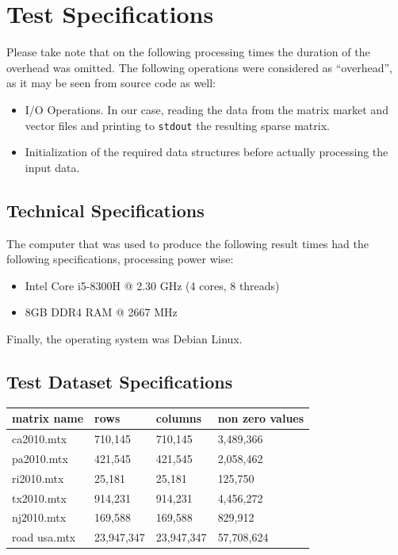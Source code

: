 \documentclass[11pt]{article}
\begin{document}
\section{Test Specifications}
\label{sec:org8809a5b}
Please take note that on the following processing times the duration of the overhead was omitted. The following operations were considered as ``overhead'', as it may be seen from source code as well:
\begin{itemize}
\item I/O Operations. In our case, reading the data from the matrix market and vector files and printing to \texttt{stdout} the resulting sparse matrix.
\item Initialization of the required data structures before actually processing the input data.
\end{itemize}
\subsection{Technical Specifications}
\label{sec:orgf984039}
The computer that was used to produce the following result times had the following specifications, processing power wise:
\begin{itemize}
\item Intel Core i5-8300H @ 2.30 GHz (4 cores, 8 threads)
\item 8GB DDR4 RAM @ 2667 MHz
\end{itemize}
Finally, the operating system was Debian Linux.
\subsection{Test Dataset Specifications}
\label{sec:org46ee9f3}
\begin{center}
\begin{tabular}{llll}
\hline
matrix name & rows & columns & non zero values\\[0pt]
\hline
ca2010.mtx & 710,145 & 710,145 & 3,489,366\\[0pt]
pa2010.mtx & 421,545 & 421,545 & 2,058,462\\[0pt]
ri2010.mtx & 25,181 & 25,181 & 125,750\\[0pt]
tx2010.mtx & 914,231 & 914,231 & 4,456,272\\[0pt]
nj2010.mtx & 169,588 & 169,588 & 829,912\\[0pt]
road usa.mtx & 23,947,347 & 23,947,347 & 57,708,624\\[0pt]
\hline
\end{tabular}
\end{center}
\end{document}
